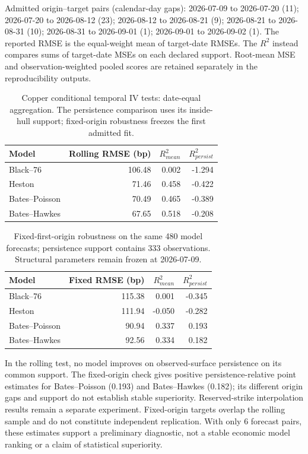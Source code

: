 Admitted origin--target pairs (calendar-day gaps): 2026-07-09 to 2026-07-20 (11); 2026-07-20 to 2026-08-12 (23); 2026-08-12 to 2026-08-21 (9); 2026-08-21 to 2026-08-31 (10); 2026-08-31 to 2026-09-01 (1); 2026-09-01 to 2026-09-02 (1).
The reported RMSE is the equal-weight mean of target-date RMSEs. The $R^2$ instead compares sums of target-date MSEs on each declared support. Root-mean MSE and observation-weighted pooled scores are retained separately in the reproducibility outputs.
\begin{table}[H]
\centering
\small
\caption{Copper conditional temporal IV tests: date-equal aggregation. The persistence comparison uses its inside-hull support; fixed-origin robustness freezes the first admitted fit.}
\label{tab:copper-temporal-models}
\begin{tabularx}{\textwidth}{@{}Xrrr@{}}
\toprule
Model & Rolling RMSE (bp) & $R^2_{mean}$ & $R^2_{persist}$ \\
\midrule
Black--76 & 106.48 & 0.002 & -1.294 \\
Heston & 71.46 & 0.458 & -0.422 \\
Bates--Poisson & 70.49 & 0.465 & -0.389 \\
Bates--Hawkes & 67.65 & 0.518 & -0.208 \\
\bottomrule
\end{tabularx}
\end{table}

\begin{table}[H]
\centering
\small
\caption{Fixed-first-origin robustness on the same 480 model forecasts; persistence support contains 333 observations. Structural parameters remain frozen at 2026-07-09.}
\label{tab:copper-fixed-origin}
\begin{tabularx}{\textwidth}{@{}Xrrr@{}}
\toprule
Model & Fixed RMSE (bp) & $R^2_{mean}$ & $R^2_{persist}$ \\
\midrule
Black--76 & 115.38 & 0.001 & -0.345 \\
Heston & 111.94 & -0.050 & -0.282 \\
Bates--Poisson & 90.94 & 0.337 & 0.193 \\
Bates--Hawkes & 92.56 & 0.334 & 0.182 \\
\bottomrule
\end{tabularx}
\end{table}

In the rolling test, no model improves on observed-surface persistence on its common support. The fixed-origin check gives positive persistence-relative point estimates for Bates--Poisson (0.193) and Bates--Hawkes (0.182); its different origin gaps and support do not establish stable superiority. Reserved-strike interpolation results remain a separate experiment. Fixed-origin targets overlap the rolling sample and do not constitute independent replication. With only 6 forecast pairs, these estimates support a preliminary diagnostic, not a stable economic model ranking or a claim of statistical superiority.

